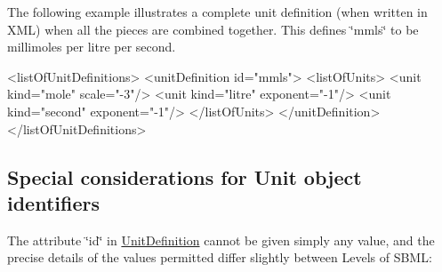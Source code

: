 The following example illustrates a complete unit definition (when written in X\+ML) when all the pieces are combined together. This defines \char`\"{}mmls\char`\"{} to be millimoles per litre per second. \begin{DoxyVerb}<listOfUnitDefinitions>
    <unitDefinition id="mmls">
        <listOfUnits>
            <unit kind="mole"   scale="-3"/>
            <unit kind="litre"  exponent="-1"/>
            <unit kind="second" exponent="-1"/>
        </listOfUnits>
    </unitDefinition>
</listOfUnitDefinitions>
\end{DoxyVerb}
\hypertarget{class_unit_definition_unitdef-id}{}\subsection{Special considerations for Unit object identifiers}\label{class_unit_definition_unitdef-id}
The attribute \char`\"{}id\char`\"{} in \hyperlink{class_unit_definition}{Unit\+Definition} cannot be given simply any value, and the precise details of the values permitted differ slightly between Levels of S\+B\+ML\+: 
